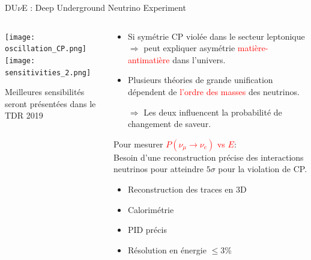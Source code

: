     \begin{frame}{DU$\nu$E : Deep Underground Neutrino Experiment}
        \begin{scriptsize}
            \begin{columns}
                \begin{column}{0.6\textwidth}
                    \centering
                    \texttt{[image: oscillation\_CP.png]}\\\vspace{0.2cm}
                    \texttt{[image: sensitivities\_2.png]}\\
                    \begin{scriptsize}
                        Meilleures sensibilités seront présentées dans le TDR 2019
                    \end{scriptsize}
                \end{column}
                \begin{column}{0.4\textwidth}
                    \begin{itemize}
                        \item Si symétrie CP violée dans le secteur leptonique $\Rightarrow$ peut expliquer asymétrie \textcolor{red}{matière-antimatière} dans l'univers.\\
                        \item Plusieurs théories de grande unification dépendent de \textcolor{red}{l'ordre des masses} des neutrinos.
                        \item[$\Rightarrow$] Les deux influencent la probabilité de changement de saveur.
                    \end{itemize}
                    \begin{scriptsize}
                        Pour mesurer \textcolor{red}{$P(\nu_{\mu}\to\nu_e)$ vs $E$}: \\
                        Besoin d'une reconstruction précise des interactions neutrinos pour atteindre $5\sigma$ pour la violation de CP.
                    \end{scriptsize}
                    \begin{itemize}
                        \item Reconstruction des traces en 3D
                        \item Calorimétrie
                        \item PID précis
                        \item Résolution en énergie $\leq$3\%
                    \end{itemize}
                \end{column}
            \end{columns}
        \end{scriptsize}
    \end{frame}

